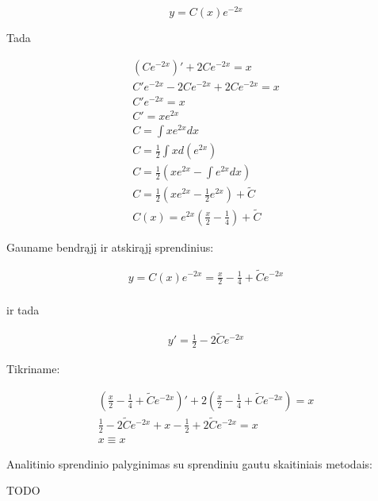 \documentclass[11pt]{article}
\begin{document}
\begin{equation}
    y = C(x)e^{-2x}
\end{equation}

Tada

\begin{equation}
\begin{split}
(Ce^{-2x})'+2Ce^{-2x}=x\\
C'e^{-2x}-2Ce^{-2x}+2Ce^{-2x}=x\\
C'e^{-2x}=x\\
C'=xe^{2x}\\
C=\int xe^{2x}dx\\
C=\frac{1}{2}\int xd(e^{2x})\\
C=\frac{1}{2}\left(xe^{2x}-\int e^{2x}dx\right)\\
C=\frac{1}{2}\left(xe^{2x}-\frac{1}{2}e^{2x}\right)+\widetilde{C}\\
C(x)=e^{2x}\left(\frac{x}{2}-\frac{1}{4}\right)+\widetilde{C}
\end{split}
\end{equation}

\newpage

Gauname bendrąjį ir atskirąjį sprendinius:

\begin{equation}
\begin{split}
y=C(x)e^{-2x}=\frac{x}{2}-\frac{1}{4}+\widetilde{C}e^{-2x}\\
\end{split}
\end{equation}

ir tada

\begin{equation}
\begin{split}
y'=\frac{1}{2}-2\widetilde{C}e^{-2x}
\end{split}
\end{equation}

Tikriname:

\begin{equation}
\begin{split}
\left(\frac{x}{2}-\frac{1}{4}+\widetilde{C}e^{-2x}\right)'+2\left(\frac{x}{2}-\frac{1}{4}+\widetilde{C}e^{-2x}\right)=x\\
\frac{1}{2}-2\widetilde{C}e^{-2x}+x-\frac{1}{2}+2\widetilde{C}e^{-2x}=x\\
x\equiv x
\end{split}
\end{equation}

Analitinio sprendinio palyginimas su sprendiniu gautu skaitiniais metodais:

TODO
\end{document}
